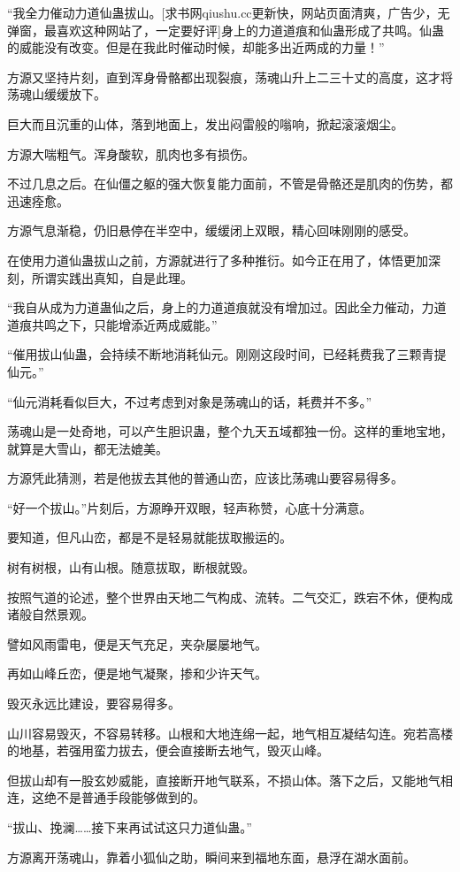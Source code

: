 \begin{this_body}
“我全力催动力道仙蛊拔山。[求书网qiushu.cc更新快，网站页面清爽，广告少，无弹窗，最喜欢这种网站了，一定要好评]身上的力道道痕和仙蛊形成了共鸣。仙蛊的威能没有改变。但是在我此时催动时候，却能多出近两成的力量！”

方源又坚持片刻，直到浑身骨骼都出现裂痕，荡魂山升上二三十丈的高度，这才将荡魂山缓缓放下。

巨大而且沉重的山体，落到地面上，发出闷雷般的嗡响，掀起滚滚烟尘。

方源大喘粗气。浑身酸软，肌肉也多有损伤。

不过几息之后。在仙僵之躯的强大恢复能力面前，不管是骨骼还是肌肉的伤势，都迅速痊愈。

方源气息渐稳，仍旧悬停在半空中，缓缓闭上双眼，精心回味刚刚的感受。

在使用力道仙蛊拔山之前，方源就进行了多种推衍。如今正在用了，体悟更加深刻，所谓实践出真知，自是此理。

“我自从成为力道蛊仙之后，身上的力道道痕就没有增加过。因此全力催动，力道道痕共鸣之下，只能增添近两成威能。”

“催用拔山仙蛊，会持续不断地消耗仙元。刚刚这段时间，已经耗费我了三颗青提仙元。”

“仙元消耗看似巨大，不过考虑到对象是荡魂山的话，耗费并不多。”

荡魂山是一处奇地，可以产生胆识蛊，整个九天五域都独一份。这样的重地宝地，就算是大雪山，都无法媲美。

方源凭此猜测，若是他拔去其他的普通山峦，应该比荡魂山要容易得多。

“好一个拔山。”片刻后，方源睁开双眼，轻声称赞，心底十分满意。

要知道，但凡山峦，都是不是轻易就能拔取搬运的。

树有树根，山有山根。随意拔取，断根就毁。

按照气道的论述，整个世界由天地二气构成、流转。二气交汇，跌宕不休，便构成诸般自然景观。

譬如风雨雷电，便是天气充足，夹杂屡屡地气。

再如山峰丘峦，便是地气凝聚，掺和少许天气。

毁灭永远比建设，要容易得多。

山川容易毁灭，不容易转移。山根和大地连绵一起，地气相互凝结勾连。宛若高楼的地基，若强用蛮力拔去，便会直接断去地气，毁灭山峰。

但拔山却有一股玄妙威能，直接断开地气联系，不损山体。落下之后，又能地气相连，这绝不是普通手段能够做到的。

“拔山、挽澜……接下来再试试这只力道仙蛊。”

方源离开荡魂山，靠着小狐仙之助，瞬间来到福地东面，悬浮在湖水面前。


\end{this_body}
